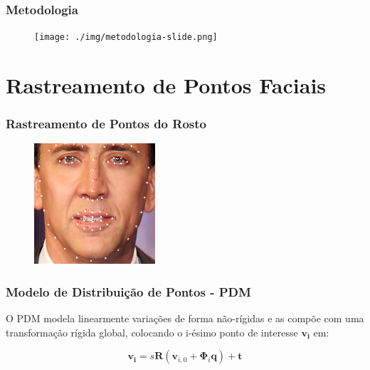 \documentclass[brazil]{beamer}
\begin{document}
\begin{frame}
	\frametitle{Metodologia}
      \begin{figure}
        \centering
        \texttt{[image: ./img/metodologia-slide.png]}
      \end{figure}   
\end{frame}

\section{Rastreamento de Pontos Faciais}

\begin{frame}
\frametitle{Rastreamento de Pontos do Rosto}
        \begin{figure}
            \centering
            \includegraphics[width = 0.4\textwidth, keepaspectratio]{./img/nick-marked.png}
      \end{figure}
\end{frame}


\begin{frame}
\frametitle{Modelo de Distribuição de Pontos - PDM}

\begin{definition}
  O PDM modela linearmente variações de forma não-rígidas e as compõe com uma transformação rígida global, colocando o i-ésimo ponto de interesse
$\bm{v_i}$ em:

\begin{equation}
 \bm{v_i} = s \bm{R} ( \bm{v}_{i,0} + \bm{\Phi}_i \bm{q}) + \bm{t}
\label{eq:PDM-equation}
\end{equation}
\end{definition}
\end{frame}
\end{document}
